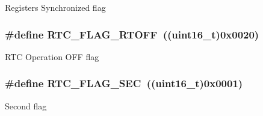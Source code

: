 \label{group__RTC__interrupts__flags_ga78c4245996bef8d5f39226b6e37ed9c0}
Registers Synchronized flag \hypertarget{group__RTC__interrupts__flags_ga203dcbb991497e4d0e6722815f6db942}{
\subsubsection[{RTC\_\-FLAG\_\-RTOFF}]{\setlength{\rightskip}{0pt plus 5cm}\#define RTC\_\-FLAG\_\-RTOFF~((uint16\_\-t)0x0020)}}
\label{group__RTC__interrupts__flags_ga203dcbb991497e4d0e6722815f6db942}
RTC Operation OFF flag \hypertarget{group__RTC__interrupts__flags_ga8babb2c823c2097bf4a4ef0c20ef7367}{
\subsubsection[{RTC\_\-FLAG\_\-SEC}]{\setlength{\rightskip}{0pt plus 5cm}\#define RTC\_\-FLAG\_\-SEC~((uint16\_\-t)0x0001)}}
\label{group__RTC__interrupts__flags_ga8babb2c823c2097bf4a4ef0c20ef7367}
Second flag 